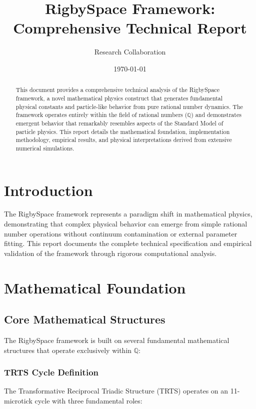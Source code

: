 \documentclass[12pt]{article}
\title{RigbySpace Framework: Comprehensive Technical Report}
\author{Research Collaboration}
\date{\today}
\begin{document}
\maketitle

\begin{abstract}
This document provides a comprehensive technical analysis of the RigbySpace framework, a novel mathematical physics construct that generates fundamental physical constants and particle-like behavior from pure rational number dynamics. The framework operates entirely within the field of rational numbers ($\mathbb{Q}$) and demonstrates emergent behavior that remarkably resembles aspects of the Standard Model of particle physics. This report details the mathematical foundation, implementation methodology, empirical results, and physical interpretations derived from extensive numerical simulations.
\end{abstract}

\section{Introduction}

The RigbySpace framework represents a paradigm shift in mathematical physics, demonstrating that complex physical behavior can emerge from simple rational number operations without continuum contamination or external parameter fitting. This report documents the complete technical specification and empirical validation of the framework through rigorous computational analysis.

\section{Mathematical Foundation}

\subsection{Core Mathematical Structures}

The RigbySpace framework is built on several fundamental mathematical structures that operate exclusively within $\mathbb{Q}$:

\subsubsection{TRTS Cycle Definition}
The Transformative Reciprocal Triadic Structure (TRTS) operates on an 11-microtick cycle with three fundamental roles:
\end{document}
